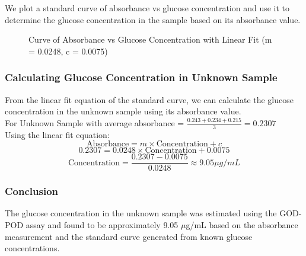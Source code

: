 \documentclass[openany]{book}
\begin{document}
We plot a standard curve of absorbance vs glucose concentration and use it to determine the glucose concentration in the sample based on its absorbance value. \\
\begin{figure}[H]
    \centering
    \caption{Curve of Absorbance vs Glucose Concentration with Linear Fit (m = 0.0248, c = 0.0075)}
\end{figure}
\subsubsection{Calculating Glucose Concentration in Unknown Sample}
From the linear fit equation of the standard curve, we can calculate the glucose concentration in the unknown sample using its absorbance value. \\
For Unknown Sample with average absorbance = $\frac{0.243 + 0.234 + 0.215}{3} = 0.2307$ \\
Using the linear fit equation: \\
$$\text{Absorbance} = m \times \text{Concentration} + c$$
$$0.2307 = 0.0248 \times \text{Concentration} + 0.0075$$
$$\text{Concentration} = \frac{0.2307 - 0.0075}{0.0248} \approx 9.05 \mu g/mL$$
\subsubsection{Conclusion}
The glucose concentration in the unknown sample was estimated using the GOD-POD assay and found to be approximately 9.05 $\mu$g/mL based on the absorbance measurement and the standard curve generated from known glucose concentrations.
\end{document}
